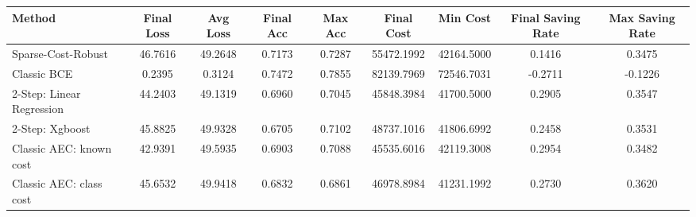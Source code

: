 \begin{tabular}{lcccccccc}
\toprule
Method & Final Loss & Avg Loss & Final Acc & Max Acc & Final Cost & Min Cost & Final Saving Rate & Max Saving Rate \\
\midrule
Sparse-Cost-Robust & 46.7616 & 49.2648 & 0.7173 & 0.7287 & 55472.1992 & 42164.5000 & 0.1416 & 0.3475 \\
Classic BCE & 0.2395 & 0.3124 & 0.7472 & 0.7855 & 82139.7969 & 72546.7031 & -0.2711 & -0.1226 \\
2-Step: Linear Regression & 44.2403 & 49.1319 & 0.6960 & 0.7045 & 45848.3984 & 41700.5000 & 0.2905 & 0.3547 \\
2-Step: Xgboost & 45.8825 & 49.9328 & 0.6705 & 0.7102 & 48737.1016 & 41806.6992 & 0.2458 & 0.3531 \\
Classic AEC: known cost & 42.9391 & 49.5935 & 0.6903 & 0.7088 & 45535.6016 & 42119.3008 & 0.2954 & 0.3482 \\
Classic AEC: class cost & 45.6532 & 49.9418 & 0.6832 & 0.6861 & 46978.8984 & 41231.1992 & 0.2730 & 0.3620 \\
\bottomrule
\end{tabular}
